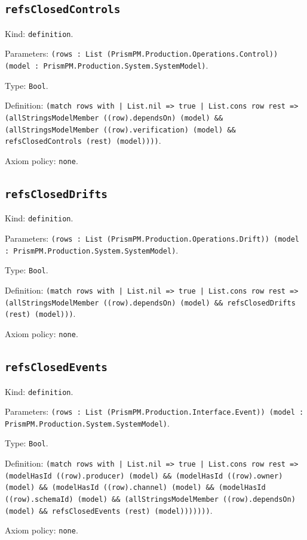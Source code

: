 \documentclass[11pt]{article}
\begin{document}
\subsection*{\texttt{refsClosedControls}}
\noindent Kind: \texttt{definition}.\par
\noindent Parameters: \texttt{(rows : List (PrismPM.Production.Operations.Control)) (model : PrismPM.Production.System.SystemModel)}.\par
\noindent Type: \texttt{Bool}.\par
\noindent Definition: \texttt{(match rows with | List.nil => true | List.cons row rest => (allStringsModelMember ((row).dependsOn) (model) \&\& (allStringsModelMember ((row).verification) (model) \&\& refsClosedControls (rest) (model))))}.\par
\noindent Axiom policy: \texttt{none}.\par
\subsection*{\texttt{refsClosedDrifts}}
\noindent Kind: \texttt{definition}.\par
\noindent Parameters: \texttt{(rows : List (PrismPM.Production.Operations.Drift)) (model : PrismPM.Production.System.SystemModel)}.\par
\noindent Type: \texttt{Bool}.\par
\noindent Definition: \texttt{(match rows with | List.nil => true | List.cons row rest => (allStringsModelMember ((row).dependsOn) (model) \&\& refsClosedDrifts (rest) (model)))}.\par
\noindent Axiom policy: \texttt{none}.\par
\subsection*{\texttt{refsClosedEvents}}
\noindent Kind: \texttt{definition}.\par
\noindent Parameters: \texttt{(rows : List (PrismPM.Production.Interface.Event)) (model : PrismPM.Production.System.SystemModel)}.\par
\noindent Type: \texttt{Bool}.\par
\noindent Definition: \texttt{(match rows with | List.nil => true | List.cons row rest => (modelHasId ((row).producer) (model) \&\& (modelHasId ((row).owner) (model) \&\& (modelHasId ((row).channel) (model) \&\& (modelHasId ((row).schemaId) (model) \&\& (allStringsModelMember ((row).dependsOn) (model) \&\& refsClosedEvents (rest) (model)))))))}.\par
\noindent Axiom policy: \texttt{none}.\par
\end{document}
